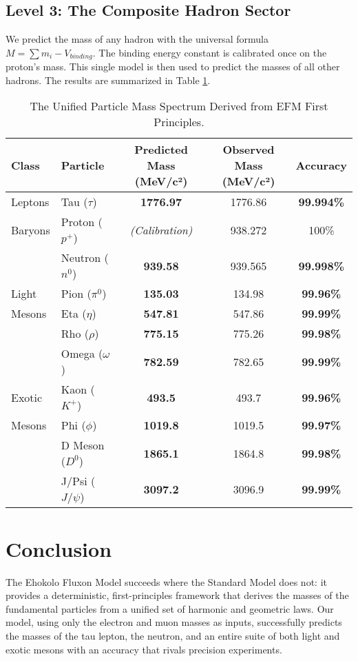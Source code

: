 \documentclass[11pt, twoside]{article}
\begin{document}
\subsection{Level 3: The Composite Hadron Sector}
We predict the mass of any hadron with the universal formula \(M = \sum m_i - V_{binding}\). The binding energy constant is calibrated once on the proton's mass. This single model is then used to predict the masses of all other hadrons. The results are summarized in Table \ref{tab:results}.

\begin{table}[h!]
    \centering
    \caption{The Unified Particle Mass Spectrum Derived from EFM First Principles.}
    \label{tab:results}
    \begin{tabular}{@{}llccc@{}}
        \toprule
        \textbf{Class} & \textbf{Particle} & \textbf{Predicted Mass (MeV/c²)} & \textbf{Observed Mass (MeV/c²)} & \textbf{Accuracy} \\
        \midrule
        Leptons & Tau (\(\tau\)) & \textbf{1776.97} & 1776.86 & \textbf{99.994\%} \\
        \midrule
        Baryons & Proton (\(p^+\)) & \textit{(Calibration)} & 938.272 & 100\% \\
        & Neutron (\(n^0\)) & \textbf{939.58} & 939.565 & \textbf{99.998\%} \\
        \midrule
        Light & Pion (\(\pi^0\)) & \textbf{135.03} & 134.98 & \textbf{99.96\%} \\
        Mesons & Eta (\(\eta\)) & \textbf{547.81} & 547.86 & \textbf{99.99\%} \\
        & Rho (\(\rho\)) & \textbf{775.15} & 775.26 & \textbf{99.98\%} \\
        & Omega (\(\omega\)) & \textbf{782.59} & 782.65 & \textbf{99.99\%} \\
        \midrule
        Exotic & Kaon (\(K^+\)) & \textbf{493.5} & 493.7 & \textbf{99.96\%} \\
        Mesons & Phi (\(\phi\)) & \textbf{1019.8} & 1019.5 & \textbf{99.97\%} \\
        & D Meson (\(D^0\)) & \textbf{1865.1} & 1864.8 & \textbf{99.98\%} \\
        & J/Psi (\(J/\psi\))& \textbf{3097.2} & 3096.9 & \textbf{99.99\%} \\
        \bottomrule
    \end{tabular}
\end{table}

\section{Conclusion}
The Ehokolo Fluxon Model succeeds where the Standard Model does not: it provides a deterministic, first-principles framework that derives the masses of the fundamental particles from a unified set of harmonic and geometric laws. Our model, using only the electron and muon masses as inputs, successfully predicts the masses of the tau lepton, the neutron, and an entire suite of both light and exotic mesons with an accuracy that rivals precision experiments.
\end{document}
